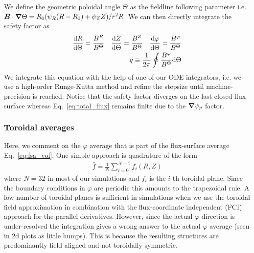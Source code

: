 We define the geometric poloidal angle $\Theta$ as the fieldline following
parameter i.e. ${\boldsymbol{B}}\cdot{\boldsymbol{\nabla}}\Theta = R_0(\psi_R (R-R_0) + \psi_Z Z)/r^2R$.
We can then directly integrate the safety factor as
\begin{align}\label{eq:safety_factor}
\frac{\mathrm{d} R}{\mathrm{d}\Theta} = \frac{B^R}{B^\Theta}\quad
\frac{\mathrm{d} Z}{\mathrm{d}\Theta} = \frac{B^Z}{B^\Theta}\quad
\frac{\mathrm{d} \varphi}{\mathrm{d}\Theta} = \frac{B^\varphi}{B^\Theta}\\
q\equiv\frac{1}{2\pi}\oint \frac{B^\varphi}{B^\Theta} \mathrm{d}\Theta
\end{align}
We integrate this equation with the help of one of our ODE integrators, i.e. we use a high-order Runge-Kutta method
and refine the stepsize until machine-precision is reached.
Notice that the safety factor diverges on the last closed flux
surface whereas Eq.~\eqref{eq:total_flux}
remains finite due to the ${\boldsymbol{\nabla}}\psi_p$ factor.
\subsubsection{Toroidal averages}
Here, we comment on the $\varphi$ average that is part of the flux-surface average Eq.~\eqref{eq:fsa_vol}.
One simple approach is
quadrature of the form
\begin{align}\label{eq:toroidal_summation}
    \bar f = \frac{1}{N} \sum_{i=0}^{N-1} f_i (R,Z)
\end{align}
where $N=32$ in most of our simulations and $f_i$ is the $i$-th toroidal plane.
Since the boundary conditions in $\varphi$ are periodic this amounts to the trapezoidal rule.
A low number of toroidal planes is sufficient in simulations when we use the toroidal field
approximation in combination with the
flux-coordinate independent (FCI) approach for the parallel derivatives.
However, since the actual $\varphi$ direction is
under-resolved the
integration gives a wrong answer to the actual $\varphi$ average (seen in 2d plots as little humps).
This is because the resulting structures are predominantly field aligned and not toroidally symmetric.


